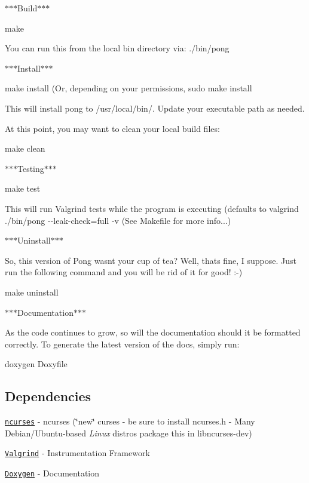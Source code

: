 $\ast$$\ast$$\ast$\+Build$\ast$$\ast$$\ast$

{\ttfamily make}

You can run this from the local {\ttfamily bin} directory via\+: {\ttfamily ./bin/pong}

$\ast$$\ast$$\ast$\+Install$\ast$$\ast$$\ast$

{\ttfamily make install} (Or, depending on your permissions, {\ttfamily sudo make install}

This will install {\ttfamily pong} to {\ttfamily /usr/local/bin/}. Update your executable path as needed.

At this point, you may want to clean your local build files\+:

{\ttfamily make clean}

$\ast$$\ast$$\ast$\+Testing$\ast$$\ast$$\ast$

{\ttfamily make test}

This will run Valgrind tests while the program is executing (defaults to {\ttfamily valgrind ./bin/pong -\/-\/leak-\/check=full -\/v} (See {\ttfamily Makefile} for more info...)

$\ast$$\ast$$\ast$\+Uninstall$\ast$$\ast$$\ast$

So, this version of Pong wasn\textquotesingle{}t your cup of tea? Well, that\textquotesingle{}s fine, I suppose. Just run the following command and you will be rid of it for good! \+:-\/)

{\ttfamily make uninstall}

$\ast$$\ast$$\ast$\+Documentation$\ast$$\ast$$\ast$

As the code continues to grow, so will the documentation should it be formatted correctly. To generate the latest version of the docs, simply run\+:

{\ttfamily doxygen Doxyfile}

\subsection*{Dependencies}


\begin{DoxyItemize}
\item \href{https://www.gnu.org/software/ncurses/}{\tt ncurses} -\/ ncurses (\char`\"{}new\char`\"{} curses -\/ be sure to install {\ttfamily ncurses.\+h} -\/ Many Debian/\+Ubuntu-\/based {\itshape Linux} distros package this in libncurses-\/dev)
\item \href{http://valgrind.org/}{\tt Valgrind} -\/ Instrumentation Framework
\item \href{http://www.stack.nl/~dimitri/doxygen/}{\tt Doxygen} -\/ Documentation
\end{DoxyItemize}

